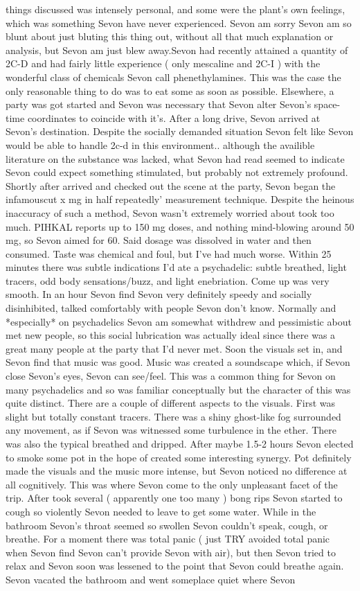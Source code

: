 \documentclass[12pt]{book}
\begin{document}
things discussed was intensely personal, and some were the plant's own feelings, which was something Sevon have never experienced. Sevon am sorry Sevon am so blunt about just bluting this thing out, without all that much explanation or analysis, but Sevon am just blew away.Sevon had recently attained a quantity of 2C-D and had fairly little experience ( only mescaline and 2C-I ) with the wonderful class of chemicals Sevon call phenethylamines. This was the case the only reasonable thing to do was to eat some as soon as possible. Elsewhere, a party was got started and Sevon was necessary that Sevon alter Sevon's space-time coordinates to coincide with it's. After a long drive, Sevon arrived at Sevon's destination. Despite the socially demanded situation Sevon felt like Sevon would be able to handle 2c-d in this environment.. although the availible literature on the substance was lacked, what Sevon had read seemed to indicate Sevon could expect something stimulated, but probably not extremely profound. Shortly after arrived and checked out the scene at the party, Sevon began the infamouscut x mg in half repeatedly' measurement technique. Despite the heinous inaccuracy of such a method, Sevon wasn't extremely worried about took too much. PIHKAL reports up to 150 mg doses, and nothing mind-blowing around 50 mg, so Sevon aimed for 60. Said dosage was dissolved in water and then consumed. Taste was chemical and foul, but I've had much worse. Within 25 minutes there was subtle indications I'd ate a psychadelic: subtle breathed, light tracers, odd body sensations/buzz, and light enebriation. Come up was very smooth. In an hour Sevon find Sevon very definitely speedy and socially disinhibited, talked comfortably with people Sevon don't know. Normally and *especially* on psychadelics Sevon am somewhat withdrew and pessimistic about met new people, so this social lubrication was actually ideal since there was a great many people at the party that I'd never met. Soon the visuals set in, and Sevon find that music was good. Music was created a soundscape which, if Sevon close Sevon's eyes, Sevon can see/feel. This was a common thing for Sevon on many psychadelics and so was familiar conceptually but the character of this was quite distinct. There are a couple of different aspects to the visuals. First was slight but totally constant tracers. There was a shiny ghost-like fog surrounded any movement, as if Sevon was witnessed some turbulence in the ether. There was also the typical breathed and dripped. After maybe 1.5-2 hours Sevon elected to smoke some pot in the hope of created some interesting synergy. Pot definitely made the visuals and the music more intense, but Sevon noticed no difference at all cognitively. This was where Sevon come to the only unpleasant facet of the trip. After took several ( apparently one too many ) bong rips Sevon started to cough so violently Sevon needed to leave to get some water. While in the bathroom Sevon's throat seemed so swollen Sevon couldn't speak, cough, or breathe. For a moment there was total panic ( just TRY avoided total panic when Sevon find Sevon can't provide Sevon with air), but then Sevon tried to relax and Sevon soon was lessened to the point that Sevon could breathe again. Sevon vacated the bathroom and went someplace quiet where Sevon 
\end{document}

